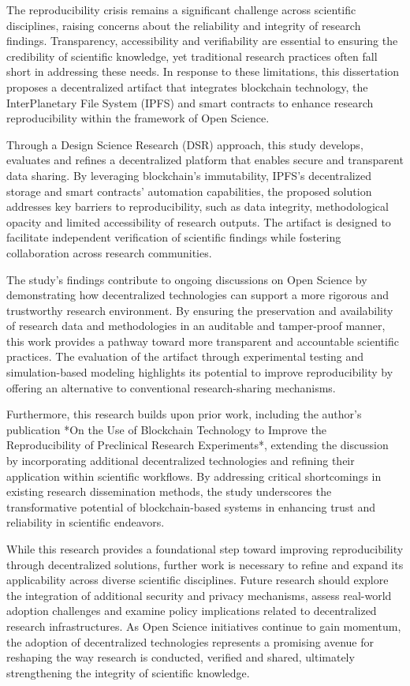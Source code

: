 \documentclass{article}
\begin{document}
The reproducibility crisis remains a significant challenge across scientific disciplines, raising concerns about the reliability and integrity of research findings. Transparency, accessibility and verifiability are essential to ensuring the credibility of scientific knowledge, yet traditional research practices often fall short in addressing these needs. In response to these limitations, this dissertation proposes a decentralized artifact that integrates blockchain technology, the InterPlanetary File System (IPFS) and smart contracts to enhance research reproducibility within the framework of Open Science.

Through a Design Science Research (DSR) approach, this study develops, evaluates and refines a decentralized platform that enables secure and transparent data sharing. By leveraging blockchain’s immutability, IPFS’s decentralized storage and smart contracts’ automation capabilities, the proposed solution addresses key barriers to reproducibility, such as data integrity, methodological opacity and limited accessibility of research outputs. The artifact is designed to facilitate independent verification of scientific findings while fostering collaboration across research communities.

The study’s findings contribute to ongoing discussions on Open Science by demonstrating how decentralized technologies can support a more rigorous and trustworthy research environment. By ensuring the preservation and availability of research data and methodologies in an auditable and tamper-proof manner, this work provides a pathway toward more transparent and accountable scientific practices. The evaluation of the artifact through experimental testing and simulation-based modeling highlights its potential to improve reproducibility by offering an alternative to conventional research-sharing mechanisms.

Furthermore, this research builds upon prior work, including the author’s publication *On the Use of Blockchain Technology to Improve the Reproducibility of Preclinical Research Experiments*, extending the discussion by incorporating additional decentralized technologies and refining their application within scientific workflows. By addressing critical shortcomings in existing research dissemination methods, the study underscores the transformative potential of blockchain-based systems in enhancing trust and reliability in scientific endeavors.

While this research provides a foundational step toward improving reproducibility through decentralized solutions, further work is necessary to refine and expand its applicability across diverse scientific disciplines. Future research should explore the integration of additional security and privacy mechanisms, assess real-world adoption challenges and examine policy implications related to decentralized research infrastructures. As Open Science initiatives continue to gain momentum, the adoption of decentralized technologies represents a promising avenue for reshaping the way research is conducted, verified and shared, ultimately strengthening the integrity of scientific knowledge.
\end{document}
